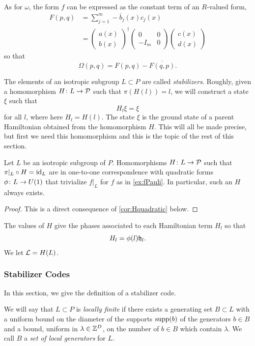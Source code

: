 \documentclass[11pt]{amsart}
\begin{document}
As for $\omega$, the form $f$ can be expressed as the constant term of an $R$-valued form,
\begin{align*}F( p,q) &= \sum_{j=1}^m - \overline{b}_j(x) c_j(x) \\
&=   \begin{pmatrix} {a}(x) \\ {b}(x) \end{pmatrix}^\dagger \begin{pmatrix} 0 & 0 \\ -I_m & 0 \end{pmatrix} \begin{pmatrix} c(x) \\ d(x) \end{pmatrix}
\end{align*}
so that
\[\Omega(p,q) = F(p,q)-\overline{F(q,p)}.\]


The elements of an isotropic subgroup $L\subset P$ are called \emph{stabilizers}. Roughly, given a homomorphism $H \colon L \to \mathcal{P}$ such that $\pi(H(l))=l$,
we will construct a state $\xi$ such that
\[ H_l \xi = \xi\]
for all $l$, where here $H_l=H(l)$. The state $\xi$ is the ground state of a parent Hamiltonian obtained from the homomorphism $H$. This will all be made precise, but first we need  this homomorphism and this is the topic of the rest of this section.


\begin{theorem}
Let $L$ be an isotropic subgroup of $P$. Homomorphisms $H \colon L \to \mathcal{P}$ such that $\pi|_L\circ H =\operatorname{id}_L$ are in one-to-one correspondence with quadratic forms $\phi \colon L \to U(1)$ that trivialize $f|_L$ for $f$ as in \eqref{ex:fPauli}. In particular, such an $H$ always exists.
\end{theorem}
\begin{proof}
This is a direct consequence of \cref{cor:Hquadratic} below.
\end{proof}

The values of $H$ give the phases associated to each Hamiltonian term $H_l$ so that
\[ H_l =\phi(l)\mathfrak{h}_l.\]
We let $\mathcal{L} =H(L)$.





\subsubsection{Stabilizer Codes}
In this section, we give the definition of a stabilizer code.


\begin{defn}
We will say that $L\subset P$ is \emph{locally finite} if there exists a generating set $B\subset L$ with a uniform bound on the diameter of the supports $\mathrm{supp}(b)$ of the generators $b \in B$ and a bound, uniform in $\lambda \in \mathbb{Z}^D$, on the number of $b\in B$ which contain $\lambda $.  We call $B$ a \emph{set of local generators} for $L$.
\end{defn}
\end{document}
